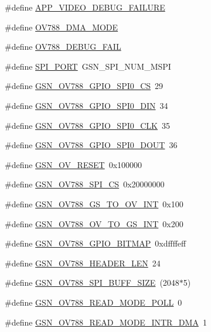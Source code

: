 \begin{DoxyCompactItemize}
\item 
\#define \hyperlink{a00537_a12d82eaeafad6bf9d726f8ada951c26a}{APP\_\-VIDEO\_\-DEBUG\_\-FAILURE}
\item 
\#define \hyperlink{a00537_a31d384363afc62e31bcc256be1630044}{OV788\_\-DMA\_\-MODE}
\item 
\#define \hyperlink{a00537_a81f4980cc3162540e05310924e7a8d09}{OV788\_\-DEBUG\_\-FAIL}
\item 
\#define \hyperlink{a00537_a8112c985f7444e82198d7571ce0a9160}{SPI\_\-PORT}~GSN\_\-SPI\_\-NUM\_\-MSPI
\item 
\#define \hyperlink{a00537_a01e018e4c5178685fbc46c045ac5d00a}{GSN\_\-OV788\_\-GPIO\_\-SPI0\_\-CS}~29
\item 
\#define \hyperlink{a00537_aba66b4f5e20b47e226bff2aac9976fed}{GSN\_\-OV788\_\-GPIO\_\-SPI0\_\-DIN}~34
\item 
\#define \hyperlink{a00537_a585ac48a0172ee6b25f0f9795c2fea76}{GSN\_\-OV788\_\-GPIO\_\-SPI0\_\-CLK}~35
\item 
\#define \hyperlink{a00537_aa3b461392852b0d010ac54ff333c84d3}{GSN\_\-OV788\_\-GPIO\_\-SPI0\_\-DOUT}~36
\item 
\#define \hyperlink{a00537_ace8e0326ad3e1b1b382dde589ab73c5d}{GSN\_\-OV\_\-RESET}~0x100000
\item 
\#define \hyperlink{a00537_a4453254e3a83038e9b0c9166e37a2afd}{GSN\_\-OV788\_\-SPI\_\-CS}~0x20000000
\item 
\#define \hyperlink{a00537_a2933565a79ef8d01d18fa21575e7289e}{GSN\_\-OV788\_\-GS\_\-TO\_\-OV\_\-INT}~0x100
\item 
\#define \hyperlink{a00537_af9417255b91078af42a150e6127bd7ba}{GSN\_\-OV788\_\-OV\_\-TO\_\-GS\_\-INT}~0x200
\item 
\#define \hyperlink{a00537_a6410c456ee5a94f559cc29a19593c562}{GSN\_\-OV788\_\-GPIO\_\-BITMAP}~0xdffffeff
\item 
\#define \hyperlink{a00537_a442fd9e3b0731ad257cc101fe54c1626}{GSN\_\-OV788\_\-HEADER\_\-LEN}~24
\item 
\#define \hyperlink{a00537_a572ce14a1306ec5a06c6e323e727d392}{GSN\_\-OV788\_\-SPI\_\-BUFF\_\-SIZE}~(2048$\ast$5)
\item 
\#define \hyperlink{a00537_a09855a349dab58d6e38434e1cdb56cfb}{GSN\_\-OV788\_\-READ\_\-MODE\_\-POLL}~0
\item 
\#define \hyperlink{a00537_aed3b15baaeb2570db93ae67dad6ea899}{GSN\_\-OV788\_\-READ\_\-MODE\_\-INTR\_\-DMA}~1
\item 

\end{DoxyCompactItemize}
